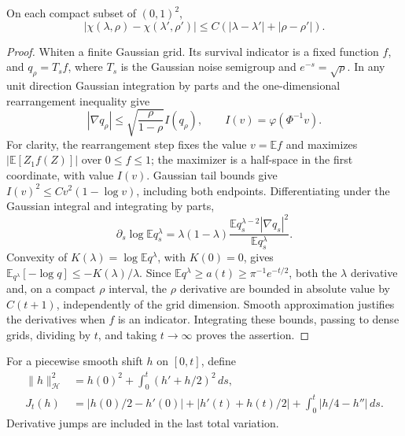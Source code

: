 \begin{proposition}\label{pr:lipschitz}
On each compact subset of $(0,1)^2$,
\[
 |\chi(\lambda,\rho)-\chi(\lambda',\rho')|
             \le C(|\lambda-\lambda'|+|\rho-\rho'|).
\]
\end{proposition}
\begin{proof}
Whiten a finite Gaussian grid. Its survival indicator is a fixed function
$f$, and $q_\rho=T_s f$, where $T_s$ is the Gaussian noise semigroup and
$e^{-s}=\sqrt\rho$. In any unit direction Gaussian integration by parts
and the one-dimensional rearrangement inequality give
\[
 |\nabla q_\rho|\le\sqrt{\frac\rho{1-\rho}} I(q_\rho),
 \qquad I(v)=\varphi(\Phi^{-1}v).
\]
For clarity, the rearrangement step fixes the value $v=\mathbb E f$ and
maximizes $|\mathbb E[Z_1 f(Z)]|$ over $0\le f\le1$; the maximizer is a
half-space in the first coordinate, with value $I(v)$. Gaussian tail
bounds give $I(v)^2\le Cv^2(1-\log v)$, including both endpoints.
Differentiating under the Gaussian integral and integrating by parts,
\[
 \partial_s\log\mathbb E q_s^\lambda
 =\lambda(1-\lambda)
   \frac{\mathbb E q_s^{\lambda-2}|\nabla q_s|^2}
        {\mathbb E q_s^\lambda}.
\]
Convexity of $K(\lambda)=\log\mathbb E q^\lambda$, with $K(0)=0$, gives
$\mathbb E_{q^\lambda}[-\log q]\le-K(\lambda)/\lambda$.
Since $\mathbb E q^\lambda\ge a(t)\ge\pi^{-1}e^{-t/2}$, both the
$\lambda$ derivative and, on a compact $\rho$ interval, the $\rho$
derivative are bounded in absolute value by $C(t+1)$, independently of
the grid dimension. Smooth approximation justifies the derivatives when
$f$ is an indicator. Integrating these bounds, passing to dense grids,
dividing by $t$, and taking $t\to\infty$ proves the assertion.
\end{proof}

For a piecewise smooth shift $h$ on $[0,t]$, define
\begin{align*}
 \|h\|_{\mathcal H}^2&=h(0)^2+\int_0^t(h'+h/2)^2\,ds,\\
 J_t(h)&=|h(0)/2-h'(0)|+|h'(t)+h(t)/2|
                         +\int_0^t|h/4-h''|\,ds.
\end{align*}
Derivative jumps are included in the last total variation.

